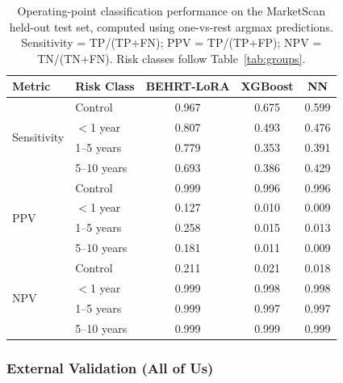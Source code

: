 \documentclass[12pt]{article}
\begin{document}
\begin{table}[H]
\centering
\caption{Operating-point classification performance on the MarketScan held-out test set, computed using one-vs-rest argmax predictions. Sensitivity = TP/(TP+FN); PPV = TP/(TP+FP); NPV = TN/(TN+FN). Risk classes follow Table~\ref{tab:groups}.}
\label{tab:diagnostic_comparison}
\begin{tabular}{llccc}
\toprule
Metric & Risk Class & BEHRT-LoRA & XGBoost & NN \\
\midrule
\multirow{4}{*}{Sensitivity}
 & Control     & 0.967 & 0.675 & 0.599 \\
 & $<$1 year   & 0.807 & 0.493 & 0.476 \\
 & 1--5 years  & 0.779 & 0.353 & 0.391 \\
 & 5--10 years & 0.693 & 0.386 & 0.429 \\
\midrule
\multirow{4}{*}{PPV}
 & Control     & 0.999 & 0.996 & 0.996 \\
 & $<$1 year   & 0.127 & 0.010 & 0.009 \\
 & 1--5 years  & 0.258 & 0.015 & 0.013 \\
 & 5--10 years & 0.181 & 0.011 & 0.009 \\
\midrule
\multirow{4}{*}{NPV}
 & Control     & 0.211 & 0.021 & 0.018 \\
 & $<$1 year   & 0.999 & 0.998 & 0.998 \\
 & 1--5 years  & 0.999 & 0.997 & 0.997 \\
 & 5--10 years & 0.999 & 0.999 & 0.999 \\
\bottomrule
\end{tabular}
\end{table}

\subsubsection{External Validation (All of Us)}
\end{document}
